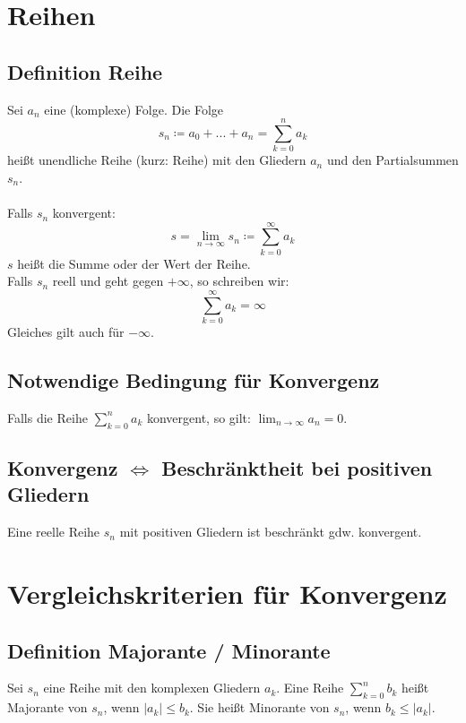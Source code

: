 \documentclass[halfparscip]{scrartcl}
\newcounter{subsection2}
\begin{document}
\newpage
\section{Reihen}
\subsection{Definition Reihe}
Sei $a_n$ eine (komplexe) Folge. Die Folge 
\begin{equation*}
	s_n \coloneqq a_0 + ... + a_n = \sum_{k=0}^{n}a_k
\end{equation*}
heißt unendliche Reihe (kurz: Reihe) mit den Gliedern $a_n$ und den Partialsummen $s_n$.\\\\
Falls $s_n$ konvergent:
\begin{equation*}
	s = \lim_{n \rightarrow \infty} s_n \coloneqq \sum_{k=0}^{\infty}a_k
\end{equation*}
$s$ heißt die Summe oder der Wert der Reihe.\\
Falls $s_n$ reell und geht gegen $+\infty$, so schreiben wir:
\begin{equation*}
	\sum_{k=0}^\infty a_k = \infty
\end{equation*}
Gleiches gilt auch für $-\infty$.

\subsection{Notwendige Bedingung für Konvergenz}
Falls die Reihe $\sum_{k=0}^{n}a_k$ konvergent, so gilt: $\lim_{n \rightarrow \infty} a_n = 0$.

\subsection{Konvergenz $\Leftrightarrow$ Beschränktheit bei positiven Gliedern}
Eine reelle Reihe $s_n$ mit positiven Gliedern ist beschränkt gdw. konvergent.

\setcounter{subsection2}{\value{subsection}}
\section*{Vergleichskriterien für Konvergenz}
\setcounter{subsection}{\value{subsection2}}
\subsection{Definition Majorante / Minorante}
Sei $s_n$ eine Reihe mit den komplexen Gliedern $a_k$. Eine Reihe $\sum_{k=0}^{n}b_k$ heißt Majorante von $s_n$, wenn $\vert a_k\vert \leq b_k$. Sie heißt Minorante von $s_n$, wenn $b_k \leq \vert{}a_k\vert$.
\end{document}
